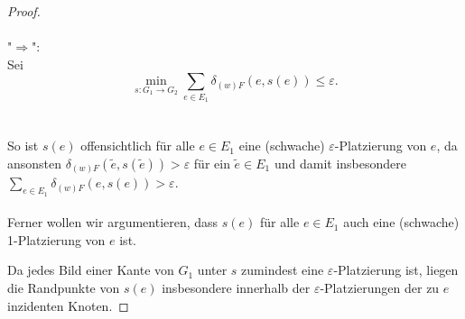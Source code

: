 \documentclass[a4paper, 12pt, twoside]{article}
\theoremstyle{Format1} %
\begin{document}
\begin{proof}
\\
\\
"$\Rightarrow$":
\\
Sei $$\min_{s: G_1 \to G_2} \sum_{e \in E_1} \delta_{(w)F}(e, s(e)) \leq {\varepsilon}.$$
\\
\\
So ist $s(e)$ offensichtlich für alle $e \in E_1$ eine (schwache) $\varepsilon$-Platzierung von $e$,
da ansonsten $\delta_{(w)F}(\tilde{e}, s(\tilde{e})) > \varepsilon$ für ein $\tilde{e} \in E_1$
und damit insbesondere $\sum_{{e}\in E_1} \delta_{(w)F}(e, s(e)) > \varepsilon$.
\\
\\
Ferner wollen wir argumentieren, dass $s(e)$ für alle $e \in E_1$ auch eine (schwache) 1-Platzierung von $e$ ist.

Da jedes Bild einer Kante von $G_1$ unter $s$ zumindest eine $\varepsilon$-Platzierung ist,
liegen die Randpunkte von $s(e)$ insbesondere innerhalb der $\varepsilon$-Platzierungen der zu $e$ inzidenten Knoten.


\end{proof}
\end{document}
